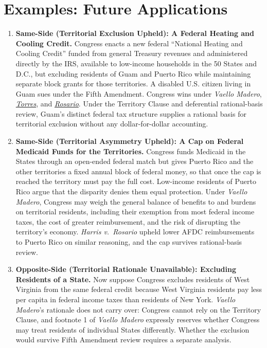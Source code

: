 \documentclass[12pt]{article}
\begin{document}
\section{Examples: Future Applications}
\begin{enumerate}

\item \textbf{Same-Side (Territorial Exclusion Upheld): A Federal Heating and Cooling Credit.} Congress enacts a new federal ``National Heating and Cooling Credit'' funded from general Treasury revenues and administered directly by the IRS, available to low-income households in the 50 States and D.C., but excluding residents of Guam and Puerto Rico while maintaining separate block grants for those territories. A disabled U.S. citizen living in Guam sues under the Fifth Amendment. Congress wins under \emph{Vaello Madero}, \href{https://supreme.justia.com/cases/federal/us/435/1/}{\emph{Torres}}, and \href{https://supreme.justia.com/cases/federal/us/446/651/}{\emph{Rosario}}. Under the Territory Clause and deferential rational-basis review, Guam's distinct federal tax structure supplies a rational basis for territorial exclusion without any dollar-for-dollar accounting.

\item \textbf{Same-Side (Territorial Asymmetry Upheld): A Cap on Federal Medicaid Funds for the Territories.} Congress funds Medicaid in the States through an open-ended federal match but gives Puerto Rico and the other territories a fixed annual block of federal money, so that once the cap is reached the territory must pay the full cost. Low-income residents of Puerto Rico argue that the disparity denies them equal protection. Under \textit{Vaello Madero}, Congress may weigh the general balance of benefits to and burdens on territorial residents, including their exemption from most federal income taxes, the cost of greater reimbursement, and the risk of disrupting the territory's economy. \textit{Harris v.\ Rosario} upheld lower AFDC reimbursements to Puerto Rico on similar reasoning, and the cap survives rational-basis review.

\item \textbf{Opposite-Side (Territorial Rationale Unavailable): Excluding Residents of a State.} Now suppose Congress excludes residents of West Virginia from the same federal credit because West Virginia residents pay less per capita in federal income taxes than residents of New York. \textit{Vaello Madero}'s rationale does not carry over: Congress cannot rely on the Territory Clause, and footnote 1 of \emph{Vaello Madero} expressly reserves whether Congress may treat residents of individual States differently. Whether the exclusion would survive Fifth Amendment review requires a separate analysis.


\end{enumerate}
\end{document}
